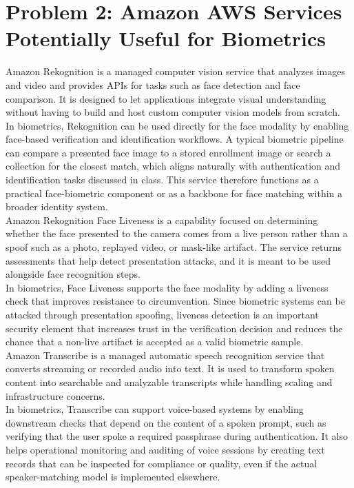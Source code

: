 \documentclass[11pt]{article}
\begin{document}
\section*{Problem 2: Amazon AWS Services Potentially Useful for Biometrics}

Amazon Rekognition is a managed computer vision service that analyzes images and video and provides APIs for tasks such as face detection and face comparison. It is designed to let applications integrate visual understanding without having to build and host custom computer vision models from scratch. \\

In biometrics, Rekognition can be used directly for the face modality by enabling face-based verification and identification workflows. A typical biometric pipeline can compare a presented face image to a stored enrollment image or search a collection for the closest match, which aligns naturally with authentication and identification tasks discussed in class. This service therefore functions as a practical face-biometric component or as a backbone for face matching within a broader identity system. \\

Amazon Rekognition Face Liveness is a capability focused on determining whether the face presented to the camera comes from a live person rather than a spoof such as a photo, replayed video, or mask-like artifact. The service returns assessments that help detect presentation attacks, and it is meant to be used alongside face recognition steps. \\

In biometrics, Face Liveness supports the face modality by adding a liveness check that improves resistance to circumvention. Since biometric systems can be attacked through presentation spoofing, liveness detection is an important security element that increases trust in the verification decision and reduces the chance that a non-live artifact is accepted as a valid biometric sample. \\

Amazon Transcribe is a managed automatic speech recognition service that converts streaming or recorded audio into text. It is used to transform spoken content into searchable and analyzable transcripts while handling scaling and infrastructure concerns. \\

In biometrics, Transcribe can support voice-based systems by enabling downstream checks that depend on the content of a spoken prompt, such as verifying that the user spoke a required passphrase during authentication. It also helps operational monitoring and auditing of voice sessions by creating text records that can be inspected for compliance or quality, even if the actual speaker-matching model is implemented elsewhere. \\
\end{document}
